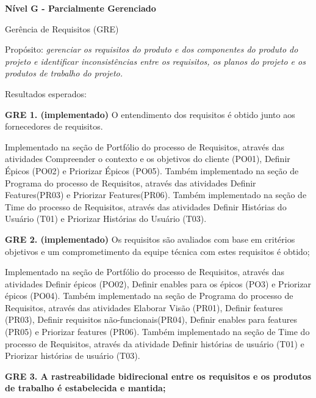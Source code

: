 \begin {enumerate}
{\item {\large \textbf{Nível G - Parcialmente Gerenciado \\}}}

\begin  {itemize}
{\item {Gerência de Requisitos (GRE)}}

{\tab Propósito: \textit{gerenciar os requisitos do produto e dos componentes do produto do projeto e identificar inconsistências entre os requisitos, os planos do projeto e os produtos de trabalho do projeto.\\}}

{Resultados esperados:\\}

{\item \textbf{GRE 1. (implementado)} O entendimento dos requisitos é obtido junto aos fornecedores de requisitos.}

Implementado na seção de Portfólio do processo de Requisitos, através das atividades Compreender o contexto e os objetivos do cliente (PO01), Definir Épicos (PO02) e Priorizar Épicos (PO05).
Também implementado na seção de Programa do processo de Requisitos, através das atividades Definir Features(PR03) e Priorizar Features(PR06).
Também implementado na seção de Time do processo de Requisitos, através das atividades Definir Histórias do Usuário (T01) e Priorizar Histórias do Usuário (T03).


{\item \textbf{GRE 2. (implementado)} Os requisitos são avaliados com base em critérios objetivos e um comprometimento da equipe técnica com estes requisitos é obtido;}

Implementado na seção de Portfólio do processo de Requisitos, através das atividades Definir épicos (PO02), Definir enables para os épicos (PO3) e Priorizar épicos (PO04).
Também implementado na seção de Programa do processo de Requisitos, através das atividades Elaborar Visão (PR01), Definir features (PR03), Definir requisitos não-funcionais(PR04), Definir enables para features (PR05) e Priorizar features (PR06).
Também implementado na seção de Time do processo de Requisitos, através da atividade Definir histórias de usuário (T01) e Priorizar histórias de usuário (T03).

{\item \textbf{GRE 3. A rastreabilidade bidirecional entre os requisitos e os produtos de trabalho é estabelecida e mantida;}}


\end{itemize}
\end{enumerate}

